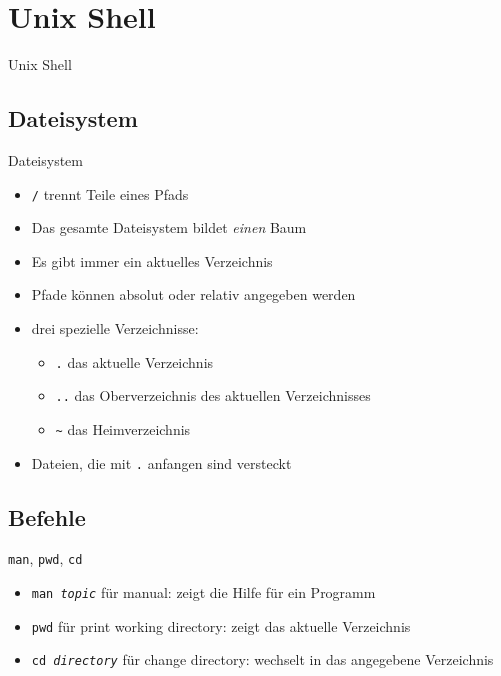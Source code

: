 \section{Unix Shell}
\begin{frame}{Unix Shell}
  \tableofcontents[sectionstyle=show/hide,
                   hideothersubsections]
\end{frame}

\subsection{Dateisystem}
\begin{frame}{Dateisystem}
  \begin{itemize}
    \item \texttt{/} trennt Teile eines Pfads
    \item Das gesamte Dateisystem bildet \emph{einen} Baum
    \item Es gibt immer ein aktuelles Verzeichnis
    \item Pfade können absolut oder relativ angegeben werden
    \item drei spezielle Verzeichnisse:
      \begin{itemize}
        \item \texttt{.} das aktuelle Verzeichnis
        \item \texttt{..} das Oberverzeichnis des aktuellen Verzeichnisses
        \item \texttt{\textasciitilde} das Heimverzeichnis
      \end{itemize}
    \item Dateien, die mit \texttt{.} anfangen sind versteckt
  \end{itemize}
\end{frame}

\subsection{Befehle}
\begin{frame}{\texttt{man}, \texttt{pwd}, \texttt{cd}}
  \begin{itemize}
    \item \texttt{man \textit{topic}} für manual: zeigt die Hilfe für ein Programm
    \item \texttt{pwd} für print working directory: zeigt das aktuelle Verzeichnis
    \item \texttt{cd \textit{directory}} für change directory: wechselt in das angegebene Verzeichnis
  \end{itemize}
\end{frame}


